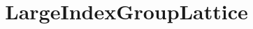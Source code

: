 \documentclass{test}
\begin{document}
\title{LargeIndexGroupLattice} \maketitle \noindent




\end{document}
